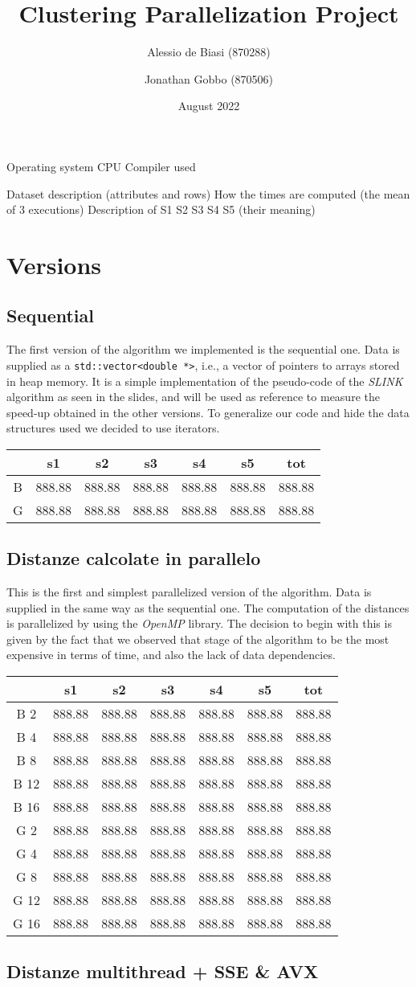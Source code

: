 \documentclass{article}
\title{Clustering Parallelization Project}
\author{Alessio de Biasi (870288) \and Jonathan Gobbo (870506)}
\date{August 2022}
\newcommand{\loremTable}{
    \begin{table}[H]
        \centering
        \begin{tabular}[H]{ccccccc}
            \hline
            & s1     & s2     & s3     & s4     & s5     & tot    \\
            \hline
            B 2  & 888.88 & 888.88 & 888.88 & 888.88 & 888.88 & 888.88 \\
            B 4  & 888.88 & 888.88 & 888.88 & 888.88 & 888.88 & 888.88 \\
            B 8  & 888.88 & 888.88 & 888.88 & 888.88 & 888.88 & 888.88 \\
            B 12 & 888.88 & 888.88 & 888.88 & 888.88 & 888.88 & 888.88 \\
            B 16 & 888.88 & 888.88 & 888.88 & 888.88 & 888.88 & 888.88 \\
            G 2  & 888.88 & 888.88 & 888.88 & 888.88 & 888.88 & 888.88 \\
            G 4  & 888.88 & 888.88 & 888.88 & 888.88 & 888.88 & 888.88 \\
            G 8  & 888.88 & 888.88 & 888.88 & 888.88 & 888.88 & 888.88 \\
            G 12 & 888.88 & 888.88 & 888.88 & 888.88 & 888.88 & 888.88 \\
            G 16 & 888.88 & 888.88 & 888.88 & 888.88 & 888.88 & 888.88 \\
            \hline
        \end{tabular}
        \label{tab:my_label}
    \end{table}
}
\newcommand{\loremTableSequential}{
    \begin{table}[H]
        \centering
        \begin{tabular}[H]{ccccccc}
            \hline
            & s1     & s2     & s3     & s4     & s5     & tot    \\
            \hline
            B & 888.88 & 888.88 & 888.88 & 888.88 & 888.88 & 888.88 \\
            G & 888.88 & 888.88 & 888.88 & 888.88 & 888.88 & 888.88 \\
            \hline
        \end{tabular}
        \label{tab:my_label}
    \end{table}
}
\begin{document}
\twocolumn
\maketitle

Operating system
CPU
Compiler used

Dataset description (attributes and rows)
How the times are computed (the mean of 3 executions)
Description of S1 S2 S3 S4 S5 (their meaning)

\hypertarget{versions}{
    \section{Versions}
    \label{versions}}

\hypertarget{sequential}{
    \subsection{Sequential}
    \label{sequential}}

The first version of the algorithm we implemented is the sequential one.
Data is supplied as a
\texttt{std::vector\textless{}double\ *\textgreater{}}, i.e., a vector
of pointers to arrays stored in heap memory. It is a simple
implementation of the pseudo-code of the \emph{SLINK} algorithm as seen
in the slides, and will be used as reference to measure the speed-up
obtained in the other versions. To generalize our code and hide the data
structures used we decided to use iterators.

\loremTableSequential


\hypertarget{distanze-calcolate-in-parallelo}{%
    \subsection{Distanze calcolate in
    parallelo}\label{distanze-calcolate-in-parallelo}}

This is the first and simplest parallelized version of the algorithm.
Data is supplied in the same way as the sequential one. The computation
of the distances is parallelized by using the \emph{OpenMP} library. The
decision to begin with this is given by the fact that we observed that
stage of the algorithm to be the most expensive in terms of time, and
also the lack of data dependencies.

\loremTable

\hypertarget{distanze-multithread-sse-avx}{%
    \subsection{Distanze multithread + SSE \&
    AVX}\label{distanze-multithread-sse-avx}}
\end{document}
